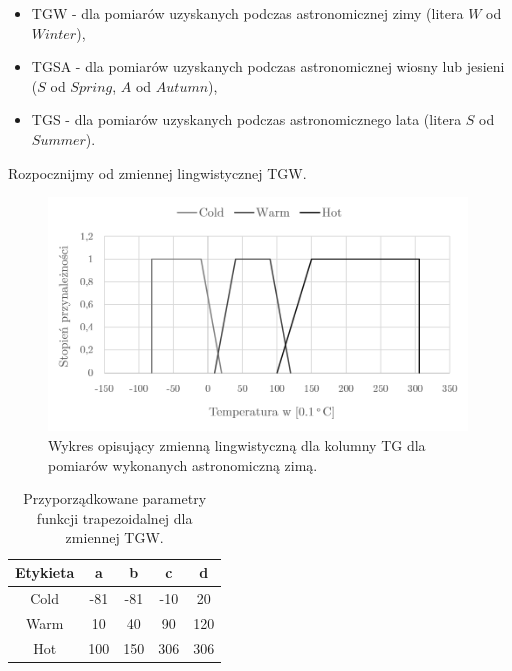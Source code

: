 \documentclass{classrep}
\begin{document}
\begin{itemize}[label=$\bullet$\scshape\bfseries]
\item TGW - dla pomiarów uzyskanych podczas astronomicznej zimy (litera $W$ od $Winter$),
\item TGSA - dla pomiarów uzyskanych podczas astronomicznej wiosny lub jesieni ($S$ od $Spring$, $A$ od $Autumn$),
\item TGS - dla pomiarów uzyskanych podczas astronomicznego lata (litera $S$ od $Summer$).\newline\newline
\end{itemize}

Rozpocznijmy od zmiennej lingwistycznej TGW.
\begin{figure}[H]
	\centering
	\includegraphics[width=0.99\textwidth]{Pictures/TermsCharts/TG_Z.png}
	\caption{Wykres opisujący zmienną lingwistyczną dla kolumny TG dla pomiarów wykonanych astronomiczną zimą.}
\end{figure}

\begin{table}[H]
	\centering
	\begin{tabular}{c c c c c} 
		\hline
		\textbf{Etykieta} & \textbf{a} & \textbf{b} & \textbf{c} & \textbf{d}\\ [0.5ex] 
		\hline
		\hline 
Cold	 &-81 & -81 & -10 & 20 \\
Warm & 10 & 40 & 90 & 120 \\
Hot	 & 100 & 150 & 306 & 306 \\
		\hline
	\end{tabular}
	\caption{Przyporządkowane parametry funkcji trapezoidalnej dla zmiennej TGW.}
\end{table}
\end{document}
